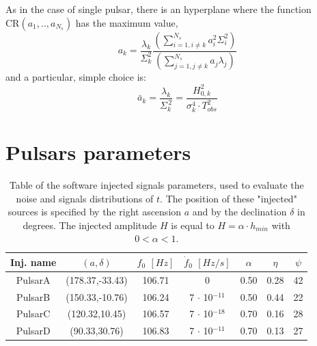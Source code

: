 \documentclass[11pt,a4paper,final]{iopart}
\begin{document}
As in the case of single pulsar, there is an hyperplane where the function $\textrm{CR}(a_1,..,a_{N_s})$ has the maximum value,
\begin{equation}
a_k=\frac{\lambda_k}{\Sigma_k^2}\frac{\left(\sum_{i=1,i\neq k}^{N_s}a_i^2\Sigma^2_i\right)}{\left(\sum_{j=1,j\neq k}^{N_s}a_j \lambda_j\right)}
\end{equation}and a particular, simple choice is:
\begin{equation}
\bar{a}_k=\frac{\lambda_k}{\Sigma_k^{\,2}}=\frac{H_{0,k}^2}{\sigma^4_k\cdot T_{obs}^2 } 
\end{equation}



\clearpage
\section{Pulsars parameters}
\begin{table}[h!]
  \begin{center}
  	\begin{tabular}{c| c c c c c c}
  	\toprule
  \textbf{Inj. name} & $(a,\delta)$ & $f_0$ $[Hz]$ & $\dot{f}_0$ $[Hz/s]$ & $\alpha$  & $\eta$ & $\psi$  \\
      \midrule
     PulsarA & (178.37,-33.43) & 106.71 &  0 & 0.50 & 0.28 & 42 \\
     PulsarB & (150.33,-10.76) & 106.24 & 7 $\cdot$ 10$^{-11}$ & 0.50 & 0.44 & 22 \\
     PulsarC & (120.32,10.45) & 106.57 & 7 $\cdot$ 10$^{-18}$ & 0.70 & 0.16 & 28 \\
     PulsarD & (90.33,30.76) & 106.83 & 7 $\cdot$ 10$^{-11}$ & 0.70 & 0.13 & 27\\
      \bottomrule
   		 \end{tabular}
  \end{center}
  \caption{ Table of the software injected signals parameters, used to evaluate the noise and signals distributions of $t$. The position of these "injected" sources is specified by the right ascension $a$ and by the declination $\delta$ in degrees. The injected amplitude $H$ is equal to $H=\alpha\cdot h_{min}$ with $0<\alpha<1$. }
  \label{softinjABCD}
\end{table}
\end{document}
